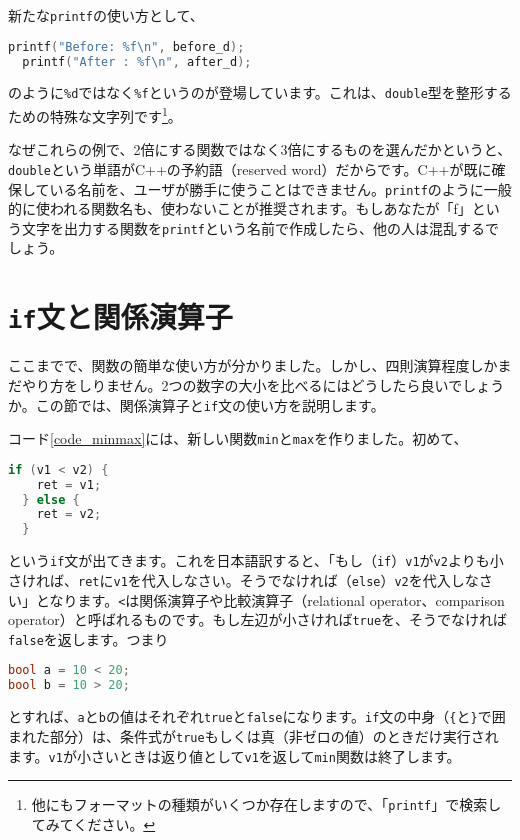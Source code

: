新たな\texttt{printf}の使い方として、
\begin{lstlisting}[language=c++]
  printf("Before: %f\n", before_d); 
  printf("After : %f\n", after_d); 
\end{lstlisting} 
のように\texttt{\%d}ではなく\texttt{\%f}というのが登場しています。これは、\texttt{double}型を整形するための特殊な文字列です\footnote{他にもフォーマットの種類がいくつか存在しますので、「\texttt{printf}」で検索してみてください。}。

なぜこれらの例で、2倍にする関数ではなく3倍にするものを選んだかというと、\texttt{double}という単語がC++の予約語（reserved word）だからです。C++が既に確保している名前を、ユーザが勝手に使うことはできません。\texttt{printf}のように一般的に使われる関数名も、使わないことが推奨されます。もしあなたが「f」という文字を出力する関数を\texttt{printf}という名前で作成したら、他の人は混乱するでしょう。

\section{\texttt{if}文と関係演算子}

ここまでで、関数の簡単な使い方が分かりました。しかし、四則演算程度しかまだやり方をしりません。2つの数字の大小を比べるにはどうしたら良いでしょうか。この節では、関係演算子と\texttt{if}文の使い方を説明します。



コード\ref{code_minmax}には、新しい関数\texttt{min}と\texttt{max}を作りました。初めて、
\begin{lstlisting}[language=c++]
  if (v1 < v2) {
    ret = v1;
  } else {
    ret = v2;
  }
\end{lstlisting}
という\texttt{if}文が出てきます。これを日本語訳すると、「もし（\texttt{if}）\texttt{v1}が\texttt{v2}よりも小さければ、\texttt{ret}に\texttt{v1}を代入しなさい。そうでなければ（\texttt{else}）\texttt{v2}を代入しなさい」となります。\texttt{<}は関係演算子や比較演算子（relational operator、comparison operator）と呼ばれるものです。もし左辺が小さければ\texttt{true}を、そうでなければ\texttt{false}を返します。つまり
\begin{lstlisting}[language=c++]
bool a = 10 < 20;
bool b = 10 > 20;
\end{lstlisting}
とすれば、\texttt{a}と\texttt{b}の値はそれぞれ\texttt{true}と\texttt{false}になります。\texttt{if}文の中身（\texttt{\{}と\texttt{\}}で囲まれた部分）は、条件式が\texttt{true}もしくは真（非ゼロの値）のときだけ実行されます。\texttt{v1}が小さいときは返り値として\texttt{v1}を返して\texttt{min}関数は終了します。

